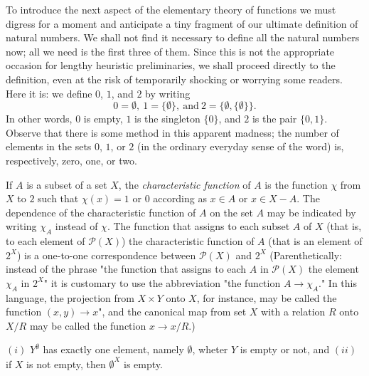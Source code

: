To introduce the next aspect of the elementary theory of functions we must digress for a moment and anticipate a tiny fragment of our ultimate definition of natural numbers. We shall not find it necessary to define all the natural numbers now; all we need is the first three of them. Since this is not the appropriate occasion for lengthy heuristic preliminaries, we shall proceed directly to the definition, even at the risk of temporarily shocking or worrying some readers. Here it is: we define  $0$, $1$, and $2$ by writing 
\begin{equation*}
0 = \emptyset , \: 1=\{ \emptyset \} , \: \text{and} \: 2 = \{ \emptyset , \{ \emptyset \} \} . 
\end{equation*}
In other words, $0$ is empty, $1$ is the singleton $\{ 0 \}$, and $2$ is the pair $ \{ 0, 1 \}$. Observe that there is some method in this apparent madness; the number of elements in the sets $0$, $1$, or $2$ (in the ordinary everyday sense of the word) is, respectively, zero, one, or two.   

If $A$ is a subset of a set $X$, the \textit{characteristic function} of $A$ is the function $\chi$ from $X$ to $2$ such that $\chi (x) = 1$ or $0$ according as $x \in A$ or $x \in X - A$. The dependence of the characteristic function of $A$ on the set $A$ may be indicated by writing $\chi_{A}$ instead of $\chi$. The function that assigns to each subset $A$ of $X$ (that is, to each element of $\mathcal{P}(X)$) the characteristic function of $A$ (that is an element of $2^{X}$) is a one-to-one correspondence between $\mathcal{P}(X)$ and $2^{X}$ (Parenthetically: instead of the phrase "the function that assigns to each $A$ in $\mathcal{P}(X)$ the element $\chi_{A}$ in $2^{X}$" it is customary to use the abbreviation "the function $A \rightarrow \chi_{A}$." In this language, the projection from $X \times Y$ onto $X$, for instance, may be called the function $(x, y) \rightarrow x$", and the canonical map from set $X$ with a relation $R$ onto $X/R$ may be called the function $x \rightarrow x/R$.) 

\begin{exercise} $(i)$ $Y^{\emptyset}$ has exactly one element, namely $\emptyset$, wheter $Y$ is empty or not, and $(ii)$ if $X$ is not empty, then $\emptyset^{X}$ is empty.

\end{exercise}